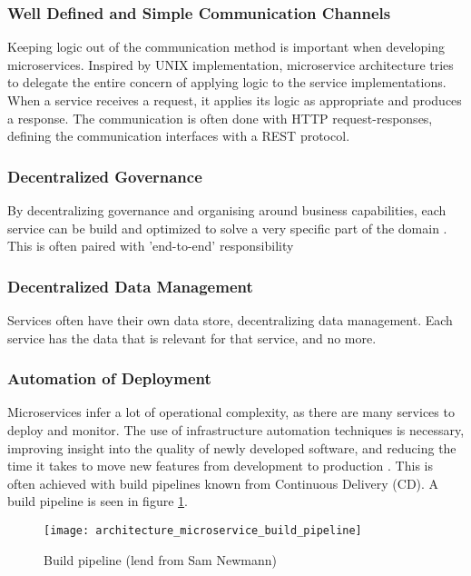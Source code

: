 {\subsubsection*{Well Defined and Simple Communication Channels}
Keeping logic out of the communication method is important when developing microservices. Inspired by UNIX implementation, microservice architecture tries to delegate the entire concern of applying logic to the service implementations. When a service receives a request, it applies its logic as appropriate and produces a response. The communication is often done with HTTP request-responses, defining the communication interfaces with a REST protocol\cite{fowler2014microservices}.

\subsubsection*{Decentralized Governance}
By decentralizing governance and organising around business capabilities, each service can be build and optimized to solve a very specific part of the domain \cite{fowler2014microservices}.
This is often paired with 'end-to-end' responsibility 

\subsubsection*{Decentralized Data Management}
Services often have their own data store, decentralizing data management. Each service has the data that is relevant for that service, and no more. 

\subsubsection*{Automation of Deployment}
Microservices infer a lot of operational complexity, as there are many services to deploy and monitor. The use of infrastructure automation techniques is necessary, improving insight into the quality of newly developed software, and reducing the time it takes to move new features from development to production \cite{newman2015microservices}. This is often achieved with build pipelines known from Continuous Delivery (CD). A build pipeline is seen in figure \ref{fig:architecture_microservice_build_pipeline}.

\begin{figure}[!htb]
  \texttt{[image: architecture\_microservice\_build\_pipeline]}  
  \caption{Build pipeline (lend from Sam Newmann)}
  \label{fig:architecture_microservice_build_pipeline}
\end{figure}

}
